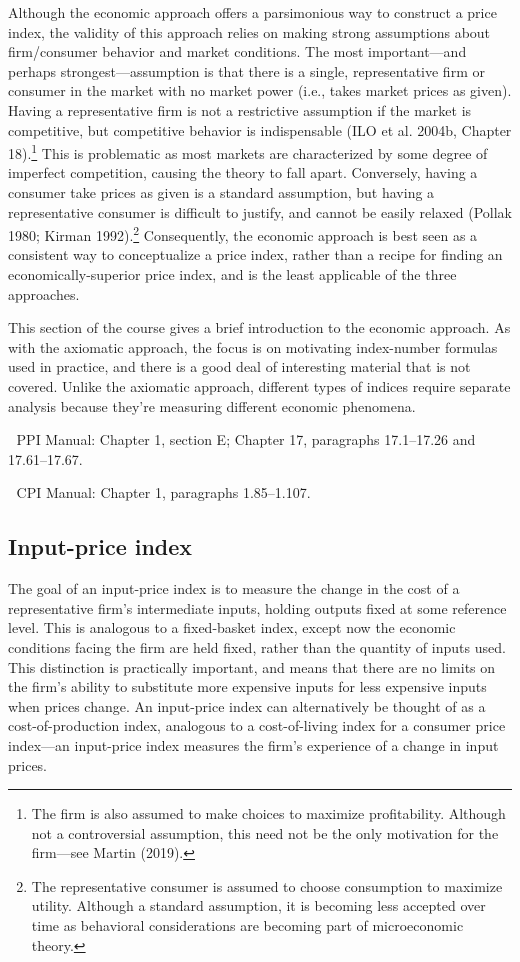 \documentclass[]{article}
\begin{document}
Although the economic approach offers a parsimonious way to construct a price index, the validity of this approach relies on making strong assumptions about firm/consumer behavior and market conditions. The most important---and perhaps strongest---assumption is that there is a single, representative firm or consumer in the market with no market power (i.e., takes market prices as given). Having a representative firm is not a restrictive assumption if the market is competitive, but competitive behavior is indispensable (ILO et al. 2004b, Chapter 18).\footnote{The firm is also assumed to make choices to maximize profitability. Although not a controversial assumption, this need not be the only motivation for the firm---see Martin (2019).} This is problematic as most markets are characterized by some degree of imperfect competition, causing the theory to fall apart. Conversely, having a consumer take prices as given is a standard assumption, but having a representative consumer is difficult to justify, and cannot be easily relaxed (Pollak 1980; Kirman 1992).\footnote{The representative consumer is assumed to choose consumption to maximize utility. Although a standard assumption, it is becoming less accepted over time as behavioral considerations are becoming part of microeconomic theory.} Consequently, the economic approach is best seen as a consistent way to conceptualize a price index, rather than a recipe for finding an economically-superior price index, and is the least applicable of the three approaches.

This section of the course gives a brief introduction to the economic approach. As with the axiomatic approach, the focus is on motivating index-number formulas used in practice, and there is a good deal of interesting material that is not covered. Unlike the axiomatic approach, different types of indices require separate analysis because they're measuring different economic phenomena.

📖 PPI Manual: Chapter 1, section E; Chapter 17, paragraphs 17.1--17.26 and 17.61--17.67.

📖 CPI Manual: Chapter 1, paragraphs 1.85--1.107.

\hypertarget{input-price-index}{%
\subsection{Input-price index}\label{input-price-index}}

The goal of an input-price index is to measure the change in the cost of a representative firm's intermediate inputs, holding outputs fixed at some reference level. This is analogous to a fixed-basket index, except now the economic conditions facing the firm are held fixed, rather than the quantity of inputs used. This distinction is practically important, and means that there are no limits on the firm's ability to substitute more expensive inputs for less expensive inputs when prices change. An input-price index can alternatively be thought of as a cost-of-production index, analogous to a cost-of-living index for a consumer price index---an input-price index measures the firm's experience of a change in input prices.
\end{document}
